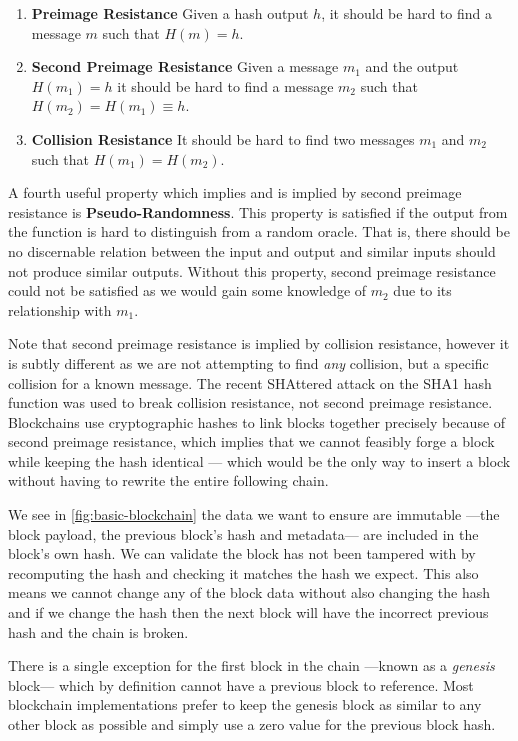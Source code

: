 \begin{enumerate}
    \item \textbf{Preimage Resistance} Given a hash output $h$, it should be hard to find a message $m$ such that $H(m) = h$.
    \item \textbf{Second Preimage Resistance} Given a message $m_1$ and the output $H(m_1) = h$ it should be hard to find a message $m_2$ such that $H(m_2) = H(m_1) \equiv h$.
    \item \textbf{Collision Resistance} It should be hard to find two messages $m_1$ and $m_2$ such that $H(m_1) = H(m_2)$.
\end{enumerate}

A fourth useful property which implies and is implied by second preimage resistance is \textbf{Pseudo-Randomness}. This property is satisfied if the output from the function is hard to distinguish from a random oracle. That is, there should be no discernable relation between the input and output and similar inputs should not produce similar outputs. Without this property, second preimage resistance could not be satisfied as we would gain some knowledge of $m_2$ due to its relationship with $m_1$.

Note that second preimage resistance is implied by collision resistance, however it is subtly different as we are not attempting to find \emph{any} collision, but a specific collision for a known message. The recent SHAttered \cite{stevensFirstCollisionFull2017} attack on the SHA1 hash function was used to break collision resistance, not second preimage resistance. Blockchains use cryptographic hashes to link blocks together precisely because of second preimage resistance, which implies that we cannot feasibly forge a block while keeping the hash identical --- which would be the only way to insert a block without having to rewrite the entire following chain.

We see in \autoref{fig:basic-blockchain} the data we want to ensure are immutable ---the block payload, the previous block's hash and metadata--- are included in the block's own hash.  We can validate the block has not been tampered with by recomputing the hash and checking it matches the hash we expect. This also means we cannot change any of the block data without also changing the hash and if we change the hash then the next block will have the incorrect previous hash and the chain is broken.

There is a single exception for the first block in the chain ---known as a \emph{genesis} block--- which by definition cannot have a previous block to reference. Most blockchain implementations prefer to keep the genesis block as similar to any other block as possible and simply use a zero value for the previous block hash.


